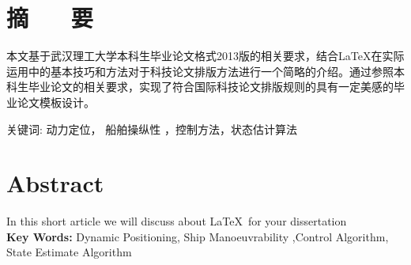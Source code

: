\section*{ \centering 摘 ~~ 要}

\vskip0.5cm
本文基于武汉理工大学本科生毕业论文格式2013版的相关要求，结合\LaTeX 在实际运用中的基本技巧和方法对于科技论文排版方法进行一个简略的介绍。通过参照本科生毕业论文的相关要求，实现了符合国际科技论文排版规则的具有一定美感的毕业论文模板设计。 


{ \heiti 关键词: } 动力定位， 船舶操纵性 ，控制方法，状态估计算法

\clearpage
\section*{ \centering \textbf{Abstract} }

In this short article we will discuss about \LaTeX\,  for your dissertation \\

\textbf{ Key Words:} Dynamic Positioning, Ship Manoeuvrability ,Control Algorithm, State Estimate Algorithm




